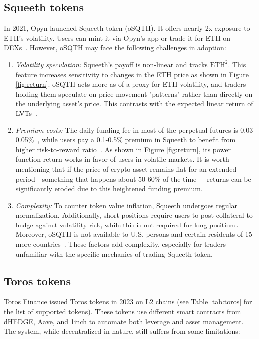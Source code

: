 \subsection{Squeeth tokens}\label{subsec:squeeth}
In 2021, Opyn launched Squeeth token (oSQTH). It offers nearly 2x exposure to ETH's volatility. Users can mint it via Opyn's app or trade it for ETH on DEXs~\cite{Squeeth_Doc}. However, oSQTH may face the following challenges in adoption:
\begin{enumerate}[label={\ref{subsec:squeeth}.\arabic*},leftmargin=*]
	\item \textit{Volatility speculation:} Squeeth's payoff is non-linear and tracks \( \text{ETH}^2 \). This feature increases sensitivity to changes in the ETH price as shown in Figure \ref{fig:return}. oSQTH acts more as of a proxy for ETH volatility, and traders holding them speculate on price movement "patterns" rather than directly on the underlying asset's price. This contrasts with the expected linear return of LVTs~\cite{Squeeth_Medium}.
	
	\item \textit{Premium costs:} The daily funding fee in most of the perpetual futures is 0.03-0.05\%~\cite{Coinglass_Funding}, while users pay a 0.1-0.5\% premium in Squeeth to benefit from higher risk-to-reward ratio~\cite{Squeeth_Funding}. As shown in Figure \ref{fig:return}, its power function return works in favor of users in volatile markets. It is worth mentioning that if the price of crypto-asset remains flat for an extended period—something that happens about 50-60\% of the time~\cite{bulkowski2011encyclopedia,edwards2007technical}—returns can be significantly eroded due to this heightened funding premium.
	
	\item \textit{Complexity:} To counter token value inflation, Squeeth undergoes regular normalization. Additionally, short positions require users to post collateral to hedge against volatility risk, while this is not required for long positions. Moreover, oSQTH is not available to U.S. persons and certain residents of 15 more countries~\cite{Squeeth_Restricted}. These factors add complexity, especially for traders unfamiliar with the specific mechanics of trading Squeeth token.
\end{enumerate}


\subsection{Toros tokens}\label{subsec:toros}
Toros Finance issued Toros tokens in 2023 on L2 chains (see Table \ref{tab:toros} for the list of supported tokens). These tokens use different smart contracts from dHEDGE, Aave, and 1inch to automate both leverage and asset management. The system, while decentralized in nature, still suffers from some limitations:

